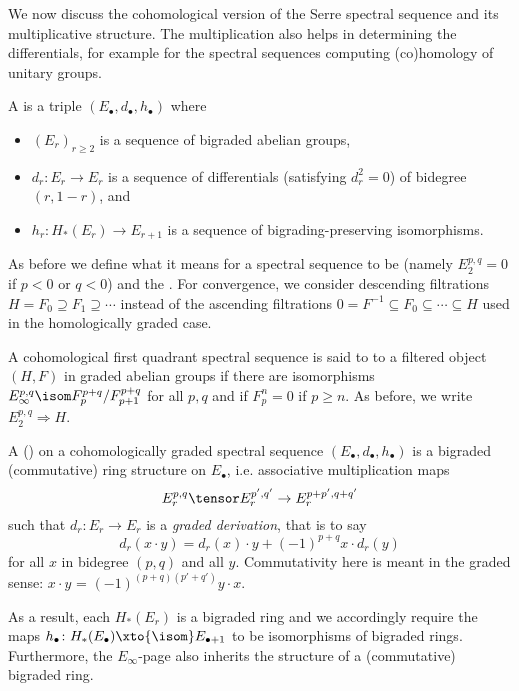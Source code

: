 We now discuss the cohomological version of the Serre spectral sequence and its multiplicative structure.
The multiplication also helps in determining the differentials, for example for the spectral sequences computing (co)homology of unitary groups.
\begin{definition}
	A 	is a triple $(E_\bullet, d_\bullet, h_\bullet)$ where
	\begin{itemize}
		\item $(E_r)_{r \geq 2}$ is a sequence of bigraded abelian groups,
		\item $d_r\colon E_r \to E_r$ is a sequence of differentials (satisfying $d_r^2 = 0$) of bidegree $(r, 1 - r)$, and
		\item $h_r\colon H_*(E_r) \to E_{r + 1}$ is a sequence of bigrading-preserving isomorphisms.
	\end{itemize}
\end{definition}
As before we define what it means for a spectral sequence to be  (namely $E^{p, q}_2 = 0$ if $p < 0$ or $q < 0$) and the .
For convergence, we consider descending filtrations $H = F_0 \supseteq F_1 \supseteq \cdots$ instead of the ascending filtrations $0 = F^{-1} \subseteq F_0 \subseteq \cdots \subseteq H$ used in the homologically graded case.
\begin{definition}
	A cohomological first quadrant spectral sequence is said to  to a filtered object $(H, F)$ in graded abelian groups if there are isomorphisms $E^{p, q}_\infty \isom F^{p + q}_p / F^{p + q}_{p + 1}$ for all $p, q$ and if $F^n_p = 0$ if $p \geq n$.
	As before, we write $E^{p, q}_2 \Rightarrow H$.
\end{definition}
\begin{definition}
	A ()  on a cohomologically graded spectral sequence $(E_\bullet, d_\bullet, h_\bullet)$ is a bigraded (commutative) ring structure on $E_\bullet$, i.e. associative multiplication maps
	\begin{equation*}
		E_r^{p, q} \tensor E_r^{p', q'} \to E_r^{p + p', q + q'}
	\end{equation*}
	such that $d_r\colon E_r \to E_r$ is a \emph{graded derivation}, that is to say
	\begin{equation*}
		d_r(x \cdot y) = d_r(x) \cdot y + (-1)^{p + q} x \cdot d_r(y)
	\end{equation*}
	for all $x$ in bidegree $(p, q)$ and all $y$.
	Commutativity here is meant in the graded sense: $x \cdot y$ = $(-1)^{(p + q)(p' + q')} y \cdot x$.

	As a result, each $H_*(E_r)$ is a bigraded ring and we accordingly require the maps $h_\bullet\colon H_*(E_\bullet) \xto{\isom} E_{\bullet + 1}$ to be isomorphisms of bigraded rings.
	Furthermore, the $E_\infty$-page also inherits the structure of a (commutative) bigraded ring.
\end{definition}
